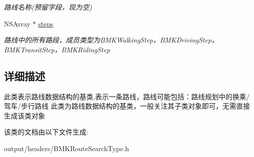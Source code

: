 \begin{DoxyCompactItemize}
\begin{DoxyCompactList}\small\item\em 路线名称(预留字段，现为空) \end{DoxyCompactList}\item 
\hypertarget{interface_b_m_k_route_line_a181c231815114b03dfc858ac26a0168a}{}N\+S\+Array $\ast$ \hyperlink{interface_b_m_k_route_line_a181c231815114b03dfc858ac26a0168a}{steps}\label{interface_b_m_k_route_line_a181c231815114b03dfc858ac26a0168a}

\begin{DoxyCompactList}\small\item\em 路线中的所有路段，成员类型为\+B\+M\+K\+Walking\+Step，\+B\+M\+K\+Driving\+Step，\+B\+M\+K\+Transit\+Step，\+B\+M\+K\+Riding\+Step \end{DoxyCompactList}\end{DoxyCompactItemize}


\subsection{详细描述}
此类表示路线数据结构的基类,表示一条路线，路线可能包括：路线规划中的换乘/驾车/步行路线 此类为路线数据结构的基类，一般关注其子类对象即可，无需直接生成该类对象 

该类的文档由以下文件生成\+:\begin{DoxyCompactItemize}
\item 
output/headers/B\+M\+K\+Route\+Search\+Type.\+h\end{DoxyCompactItemize}
